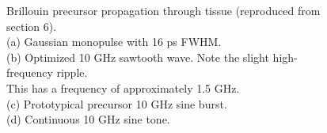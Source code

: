 \documentclass[fleqn,10pt]{article}
\begin{document}
\begin{figure}[H]
	
	\caption{Brillouin precursor propagation through tissue (reproduced from section 6).\\
	(a) Gaussian monopulse with 16 ps FWHM.\\
	(b) Optimized 10 GHz sawtooth wave. Note the slight high-frequency ripple.\\ This has a frequency of approximately 1.5 GHz.\\
	(c) Prototypical precursor 10 GHz sine burst.\\
	(d) Continuous 10 GHz sine tone.}

\end{figure}



%	
%



\clearpage
















\clearpage





%











%











\end{document}
